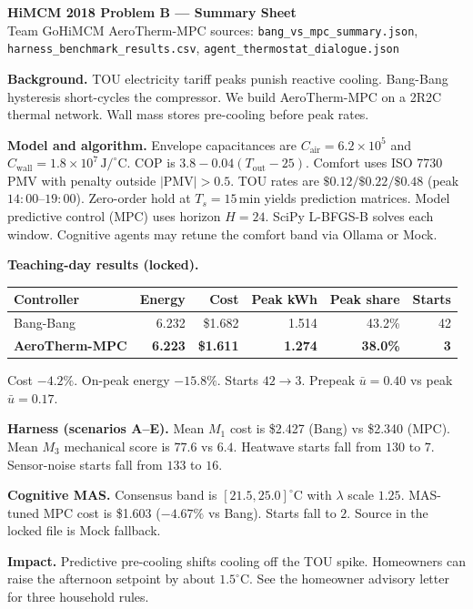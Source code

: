 \documentclass[11pt]{article}
\begin{document}
\begin{center}
{\Large\bfseries HiMCM 2018 Problem B --- Summary Sheet}\\[0.15em]
{\small Team GoHiMCM \quad AeroTherm-MPC \quad
sources: \texttt{bang\_vs\_mpc\_summary.json},
\texttt{harness\_benchmark\_results.csv},
\texttt{agent\_thermostat\_dialogue.json}}
\end{center}
\vspace{0.25em}

\noindent\textbf{Background.}
TOU electricity tariff peaks punish reactive cooling.
Bang-Bang hysteresis short-cycles the compressor.
We build AeroTherm-MPC on a 2R2C thermal network.
Wall mass stores pre-cooling before peak rates.

\medskip
\noindent\textbf{Model and algorithm.}
Envelope capacitances are $C_{\mathrm{air}}=6.2\times 10^5$ and
$C_{\mathrm{wall}}=1.8\times 10^7\,\mathrm{J/^\circ C}$.
COP is $3.8-0.04(T_{\mathrm{out}}-25)$.
Comfort uses ISO 7730 PMV with penalty outside $|\mathrm{PMV}|>0.5$.
TOU rates are $\$0.12/\$0.22/\$0.48$ (peak $14{:}00$--$19{:}00$).
Zero-order hold at $T_s=15\,\mathrm{min}$ yields prediction matrices.
Model predictive control (MPC) uses horizon $H=24$.
SciPy L-BFGS-B solves each window.
Cognitive agents may retune the comfort band via Ollama or Mock.

\medskip
\noindent\textbf{Teaching-day results (locked).}
\begin{center}
\scriptsize
\begin{tabular}{lrrrrr}
\toprule
Controller & Energy & Cost & Peak kWh & Peak share & Starts \\
\midrule
Bang-Bang & 6.232 & \$1.682 & 1.514 & 43.2\% & 42 \\
\textbf{AeroTherm-MPC} & \textbf{6.223} & \textbf{\$1.611} & \textbf{1.274} & \textbf{38.0\%} & \textbf{3} \\
\bottomrule
\end{tabular}
\end{center}
\vspace{0.1em}
Cost $-4.2\%$. On-peak energy $-15.8\%$. Starts $42\to 3$.
Prepeak $\bar u=0.40$ vs peak $\bar u=0.17$.

\medskip
\noindent\textbf{Harness (scenarios A--E).}
Mean $M_1$ cost is \$2.427 (Bang) vs \$2.340 (MPC).
Mean $M_3$ mechanical score is $77.6$ vs $6.4$.
Heatwave starts fall from $130$ to $7$.
Sensor-noise starts fall from $133$ to $16$.

\medskip
\noindent\textbf{Cognitive MAS.}
Consensus band is $[21.5,25.0]^\circ\mathrm{C}$ with $\lambda$ scale $1.25$.
MAS-tuned MPC cost is \$1.603 ($-4.67\%$ vs Bang).
Starts fall to $2$. Source in the locked file is Mock fallback.

\medskip
\noindent\textbf{Impact.}
Predictive pre-cooling shifts cooling off the TOU spike.
Homeowners can raise the afternoon setpoint by about $1.5^\circ\mathrm{C}$.
See the homeowner advisory letter for three household rules.
\end{document}
